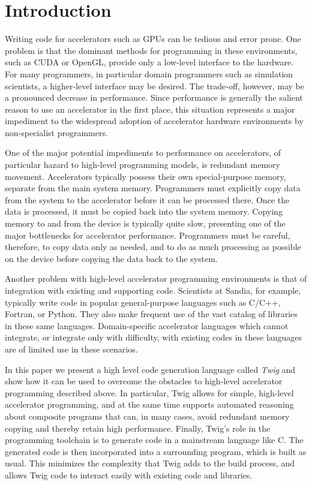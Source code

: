 
\section{Introduction}

Writing code for accelerators such as GPUs can be tedious and error prone. One
problem is that the dominant methods for programming in these environments,
such as CUDA or OpenGL, provide only a low-level interface to the hardware.
For many programmers, in particular domain programmers such as simulation
scientists, a higher-level interface may be desired. The trade-off, however,
may be a pronounced decrease in performance. Since performance is generally
the salient reason to use an accelerator in the first place, this situation
represents a major impediment to the widespread adoption of accelerator
hardware environments by non-specialist programmers.

One of the major potential impediments to performance on accelerators, of
particular hazard to high-level programming models, is redundant memory
movement. Accelerators typically possess their own special-purpose memory,
separate from the main system memory. Programmers must explicitly copy data
from the system to the accelerator before it can be processed there. Once the
data is processed, it must be copied back into the system memory. Copying
memory to and from the device is typically quite slow, presenting one of the
major bottlenecks for accelerator performance. Programmers must be careful,
therefore, to copy data only as needed, and to do as much processing as
possible on the device before copying the data back to the system.

Another problem with high-level accelerator programming environments is that
of integration with existing and supporting code. Scientists at Sandia, for
example, typically write code in popular general-purpose languages such as
C/C++, Fortran, or Python. They also make frequent use of the vast catalog of
libraries in these same languages. Domain-specific accelerator languages which
cannot integrate, or integrate only with difficulty, with existing codes in
these languages are of limited use in these scenarios.

In this paper we present a high level code generation language called
\emph{Twig} and show how it can be used to overcome the obstacles to
high-level accelerator programming described above. In particular, Twig allows
for simple, high-level accelerator programming, and at the same time supports
automated reasoning about composite programs that can, in many cases, avoid
redundant memory copying and thereby retain high performance. Finally, Twig's
role in the programming toolchain is to generate code in a mainstream language
like C. The generated code is then incorporated into a surrounding program,
which is built as usual. This minimizes the complexity that Twig adds to the
build process, and allows Twig code to interact easily with existing code and
libraries.

